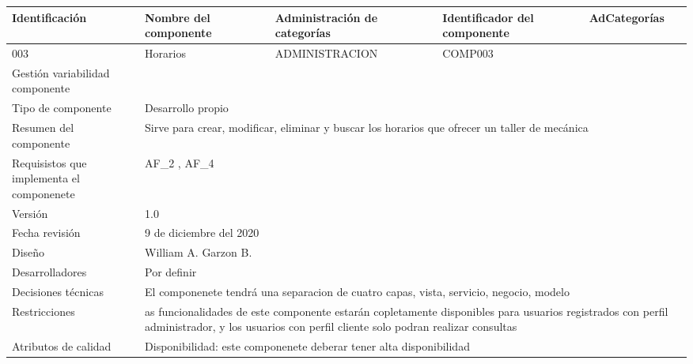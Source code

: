 \documentclass[10pt,a4paper,openany]{book}
\begin{document}
\begin{longtable}{|p{3cm}|p{3cm}|p{3cm}|p{3cm}|p{3cm}|} \hline	
Identificación & Nombre del componente & Administración de categorías & Identificador del componente & AdCategorías \\[0.5ex] \hline	
003 & Horarios & ADMINISTRACION & COMP003 &  \\[0.5ex] \hline	
Gestión variabilidad componente & \multicolumn{4}{p{12cm}|}{} \\ \hline	
Tipo de componente     & \multicolumn{4}{p{12cm}|}{Desarrollo propio} \\ \hline	
Resumen del componente & \multicolumn{4}{p{12cm}|}{Sirve para crear, modificar, eliminar y buscar los horarios que ofrecer un taller de mecánica} \\ \hline	
Requisistos que implementa el componenete & \multicolumn{4}{p{12cm}|}{AF\_2 , AF\_4} \\ \hline	
Versión                & \multicolumn{4}{p{12cm}|}{1.0} \\ \hline	
Fecha revisión         & \multicolumn{4}{p{12cm}|}{9 de diciembre del 2020} \\ \hline	
Diseño                 & \multicolumn{4}{p{12cm}|}{William A. Garzon B.} \\ \hline	
Desarrolladores        & \multicolumn{4}{p{12cm}|}{Por definir} \\ \hline	
Decisiones técnicas    & \multicolumn{4}{p{12cm}|}{El componenete tendrá una separacion de cuatro capas, vista, servicio, negocio, modelo} \\ \hline	
Restricciones          & \multicolumn{4}{p{12cm}|}{as funcionalidades de este componente estarán copletamente disponibles para usuarios registrados con perfil administrador, y los usuarios con perfil cliente solo podran realizar consultas} \\ \hline	
Atributos de calidad   & \multicolumn{4}{p{12cm}|}{Disponibilidad: este componenete deberar tener alta disponibilidad} \\ \hline	
\end{longtable}
\end{document}
